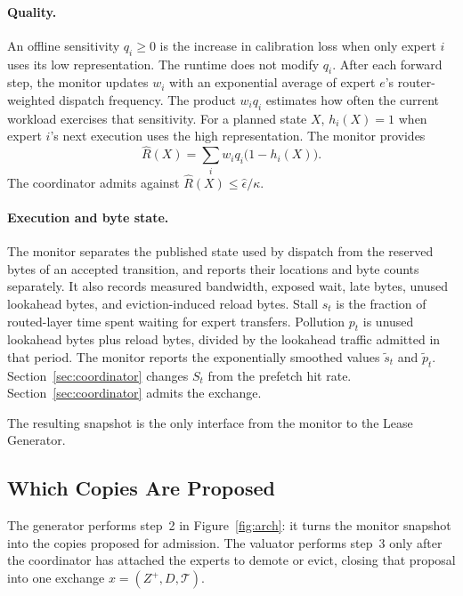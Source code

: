\paragraph{Quality.}
An offline sensitivity \(q_i\geq 0\) is the increase in calibration loss when only expert \(i\) uses its low representation.
The runtime does not modify \(q_i\).
After each forward step, the monitor updates \(w_i\) with an exponential average of expert \(e\)'s router-weighted dispatch frequency.
The product \(w_iq_i\) estimates how often the current workload exercises that sensitivity.
For a planned state \(X\), \(h_i(X)=1\) when expert \(i\)'s next execution uses the high representation.
The monitor provides
\begin{equation}
  \widehat R(X)
  =\sum_i w_i q_i\bigl(1-h_i(X)\bigr).
  \label{eq:risk}
\end{equation}
The coordinator admits against \(\widehat R(X)\leq\widehat\epsilon/\kappa\).

\paragraph{Execution and byte state.}
The monitor separates the published state used by dispatch from the reserved bytes of an accepted transition, and reports their locations and byte counts separately.
It also records measured bandwidth, exposed wait, late bytes, unused lookahead bytes, and eviction-induced reload bytes.
Stall \(s_t\) is the fraction of routed-layer time spent waiting for expert transfers.
Pollution \(p_t\) is unused lookahead bytes plus reload bytes, divided by the lookahead traffic admitted in that period.
The monitor reports the exponentially smoothed values \(\widetilde s_t\) and \(\widetilde p_t\).
Section~\ref{sec:coordinator} changes \(S_t\) from the prefetch hit rate. Section~\ref{sec:coordinator} admits the exchange.

The resulting snapshot is the only interface from the monitor to the Lease Generator.

\subsection{Which Copies Are Proposed}
\label{sec:leases}
\label{sec:actions}

The generator performs step~2 in Figure~\ref{fig:arch}: it turns the monitor snapshot into the copies proposed for admission.
The valuator performs step~3 only after the coordinator has attached the experts to demote or evict, closing that proposal into one exchange \(x=(Z^{+},D,\mathcal{T})\).

